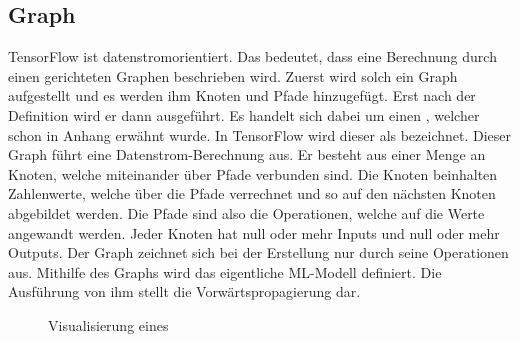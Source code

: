\subsection{Graph}
TensorFlow ist datenstromorientiert. Das bedeutet, dass eine Berechnung
durch einen gerichteten Graphen beschrieben wird. Zuerst wird solch ein Graph
aufgestellt und es werden ihm Knoten und Pfade hinzugefügt. Erst nach der Definition wird er dann ausgeführt.
Es handelt sich dabei um einen , welcher schon in
Anhang  erwähnt wurde.
In TensorFlow wird dieser als  bezeichnet.
\para{}
Dieser Graph führt eine Datenstrom-Berechnung aus.
Er besteht aus einer Menge an Knoten, welche miteinander über Pfade
verbunden sind. Die Knoten beinhalten Zahlenwerte, welche über die Pfade
verrechnet und so auf den nächsten Knoten abgebildet werden.
Die Pfade sind also die Operationen, welche auf die Werte
angewandt werden. Jeder Knoten hat null oder mehr Inputs und null oder mehr Outputs.
Der Graph zeichnet sich bei der Erstellung nur durch seine Operationen aus.
\para{}
Mithilfe des Graphs wird das eigentliche ML-Modell definiert. Die Ausführung von
ihm stellt die Vorwärtspropagierung dar.
\para{}

\begin{figure}[h!]
  \caption{Visualisierung eines }
\end{figure}

